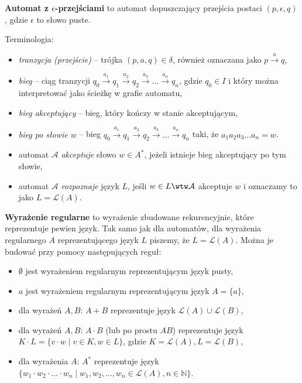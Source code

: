 \textbf{Automat z $\epsilon$-przejściami} to automat dopuszczający przejścia postaci $(p, \epsilon, q)$, gdzie $\epsilon$ to słowo puste.

Terminologia:
\begin{itemize}
    \item \textit{tranzycja (przejście)} -- trójka $(p, a, q) \in \delta$, również oznaczana jako $p \xrightarrow{a} q$,
    \item \textit{bieg} -- ciąg tranzycji $q_0 \xrightarrow{a_1} q_1 \xrightarrow{a_2} q_2 \xrightarrow{a_3} \ldots \xrightarrow{a_n} q_n$, gdzie $q_0 \in I$ i który można interpretować jako ścieżkę w grafie automatu,
    \item \textit{bieg akceptujący} -- bieg, który kończy w stanie akceptującym,
    \item \textit{bieg po słowie $w$} -- bieg $q_0 \xrightarrow{a_1} q_1 \xrightarrow{a_2} q_2 \xrightarrow{a_3} \ldots \xrightarrow{a_n} q_n$ taki, że $a_1 a_2 a_3 \ldots a_n = w$.
    \item automat $\mathcal{A}$ \textit{akceptuje} słowo $w \in A^*$, jeżeli istnieje bieg akceptujący po tym słowie,
    \item automat $\mathcal{A}$ \textit{rozpoznaje} język $L$, jeśli $w \in L \wtw \mathcal{A}$ akceptuje $w$ i oznaczamy to jako $L = \mathcal{L}(A)$.
\end{itemize}

\textbf{Wyrażenie regularne} to wyrażenie zbudowane rekurencyjnie, które reprezentuje pewien język. Tak samo jak dla automatów, dla wyrażenia regularnego $A$ reprezentującego język $L$ piszemy, że $L = \mathcal{L}(A)$. Można je budować przy pomocy następujących reguł:
\begin{itemize}
    \item $\emptyset$ jest wyrażeniem regularnym reprezentującym język pusty,
    \item $a$ jest wyrażeniem regularnym reprezentującym język $A = \{ a \}$,
    \item dla wyrażeń $A, B$: $A + B$ reprezentuje język $\mathcal{L}(A) \cup \mathcal{L}(B)$,
    \item dla wyrażeń $A, B$: $A \cdot B$ (lub po prostu $AB$) reprezentuje język $K \cdot L = \{ v \cdot w \mid v \in K, w \in L \}$, gdzie $K = \mathcal{L}(A), L = \mathcal{L}(B)$,
    \item dla wyrażenia $A$: $A^*$ reprezentuje język $\{ w_1 \cdot w_2 \cdot \ldots \cdot w_n \mid w_1, w_2, \ldots, w_n \in \mathcal{L}(A), n \in \mathbb{N} \}$.
\end{itemize}


